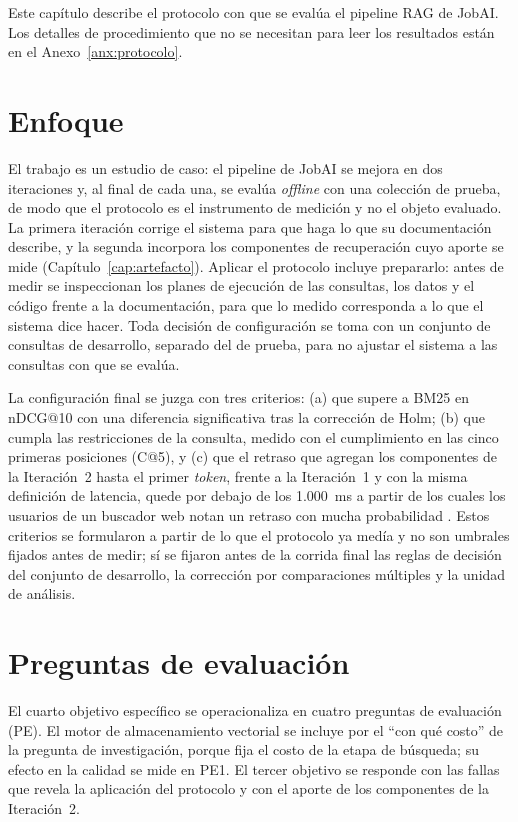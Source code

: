 Este capítulo describe el protocolo con que se evalúa el pipeline RAG de JobAI. Los detalles de procedimiento que no se necesitan para leer los resultados están en el Anexo~\ref{anx:protocolo}.

\section{Enfoque}
\label{sec:met-enfoque}

El trabajo es un estudio de caso: el pipeline de JobAI se mejora en dos iteraciones y, al final de cada una, se evalúa \textit{offline} con una colección de prueba, de modo que el protocolo es el instrumento de medición y no el objeto evaluado. La primera iteración corrige el sistema para que haga lo que su documentación describe, y la segunda incorpora los componentes de recuperación cuyo aporte se mide (Capítulo~\ref{cap:artefacto}). Aplicar el protocolo incluye prepararlo: antes de medir se inspeccionan los planes de ejecución de las consultas, los datos y el código frente a la documentación, para que lo medido corresponda a lo que el sistema dice hacer. Toda decisión de configuración se toma con un conjunto de consultas de desarrollo, separado del de prueba, para no ajustar el sistema a las consultas con que se evalúa.

La configuración final se juzga con tres criterios: (a) que supere a BM25 en nDCG@10 con una diferencia significativa tras la corrección de Holm; (b) que cumpla las restricciones de la consulta, medido con el cumplimiento en las cinco primeras posiciones (C@5), y (c) que el retraso que agregan los componentes de la Iteración~2 hasta el primer \textit{token}, frente a la Iteración~1 y con la misma definición de latencia, quede por debajo de los 1.000~ms a partir de los cuales los usuarios de un buscador web notan un retraso con mucha probabilidad \citep{Arapakis2014,Bai2017}. Estos criterios se formularon a partir de lo que el protocolo ya medía y no son umbrales fijados antes de medir; sí se fijaron antes de la corrida final las reglas de decisión del conjunto de desarrollo, la corrección por comparaciones múltiples y la unidad de análisis.

\section{Preguntas de evaluación}
\label{sec:met-preguntas}

El cuarto objetivo específico se operacionaliza en cuatro preguntas de evaluación (PE). El motor de almacenamiento vectorial se incluye por el \enquote{con qué costo} de la pregunta de investigación, porque fija el costo de la etapa de búsqueda; su efecto en la calidad se mide en PE1. El tercer objetivo se responde con las fallas que revela la aplicación del protocolo y con el aporte de los componentes de la Iteración~2.

